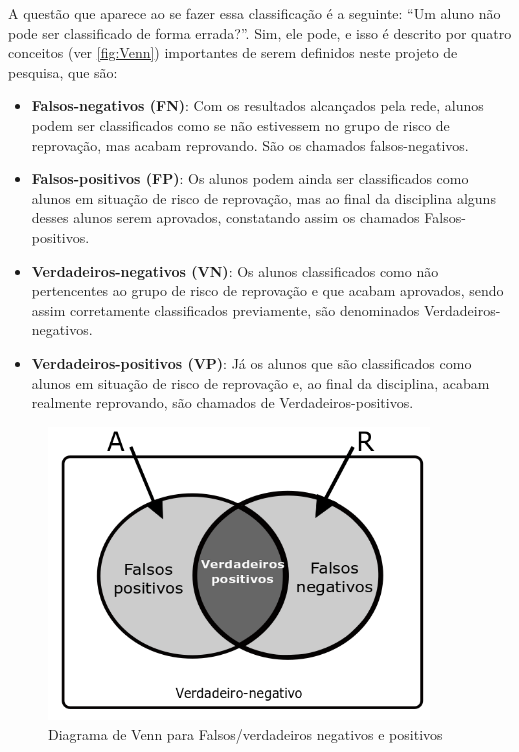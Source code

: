 A questão que aparece ao se fazer essa classificação é a seguinte: ``Um aluno não pode ser classificado de forma errada?''. Sim, ele pode, e isso é descrito por quatro conceitos (ver \autoref{fig:Venn}) importantes de serem definidos neste projeto de pesquisa, que são:

\begin{itemize}
    \item \textbf{Falsos-negativos (FN)}: Com os resultados alcançados pela rede, alunos podem ser classificados como se não estivessem no grupo de risco de reprovação, mas acabam reprovando. São os chamados falsos-negativos.
    \item \textbf{Falsos-positivos (FP)}: Os alunos podem ainda ser classificados como alunos em situação de risco de reprovação, mas ao final da disciplina alguns desses alunos serem aprovados, constatando assim os chamados Falsos-positivos.
    \item \textbf{Verdadeiros-negativos (VN)}: Os alunos classificados como não pertencentes ao grupo de risco de reprovação e que acabam aprovados, sendo assim corretamente classificados previamente, são denominados Verdadeiros-negativos.
    \item \textbf{Verdadeiros-positivos (VP)}: Já os alunos que são classificados como alunos em situação de risco de reprovação e, ao final da disciplina, acabam realmente reprovando, são chamados de Verdadeiros-positivos.
\end{itemize}

\begin{figure}
    \centering
    \includegraphics[width=0.9\textwidth]{modelo-monografia-rej-2018/img/DiagramaVenn.png}
    \caption{Diagrama de Venn para Falsos/verdadeiros negativos e positivos}
    \label{fig:Venn}
\end{figure}

